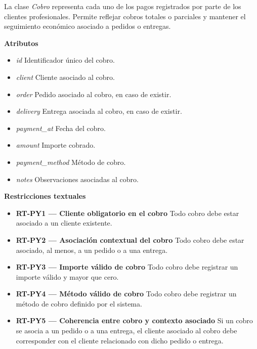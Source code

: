 La clase \textit{Cobro} representa cada uno de los pagos registrados por parte de los clientes profesionales. Permite reflejar cobros totales o parciales y mantener el seguimiento económico asociado a pedidos o entregas.

\textbf{Atributos}

\begin{itemize}
      \item \textit{id}
            Identificador único del cobro.
      \item \textit{client}
            Cliente asociado al cobro.
      \item \textit{order}
            Pedido asociado al cobro, en caso de existir.
      \item \textit{delivery}
            Entrega asociada al cobro, en caso de existir.
      \item \textit{payment\_at}
            Fecha del cobro.
      \item \textit{amount}
            Importe cobrado.
      \item \textit{payment\_method}
            Método de cobro.
      \item \textit{notes}
            Observaciones asociadas al cobro.
\end{itemize}

\textbf{Restricciones textuales}

\begin{itemize}
      \item \textbf{RT-PY1 — Cliente obligatorio en el cobro}
            Todo cobro debe estar asociado a un cliente existente.
      \item \textbf{RT-PY2 — Asociación contextual del cobro}
            Todo cobro debe estar asociado, al menos, a un pedido o a una entrega.
      \item \textbf{RT-PY3 — Importe válido de cobro}
            Todo cobro debe registrar un importe válido y mayor que cero.
      \item \textbf{RT-PY4 — Método válido de cobro}
            Todo cobro debe registrar un método de cobro definido por el sistema.
      \item \textbf{RT-PY5 — Coherencia entre cobro y contexto asociado}
            Si un cobro se asocia a un pedido o a una entrega, el cliente asociado al cobro debe corresponder con el cliente relacionado con dicho pedido o entrega.
\end{itemize}


